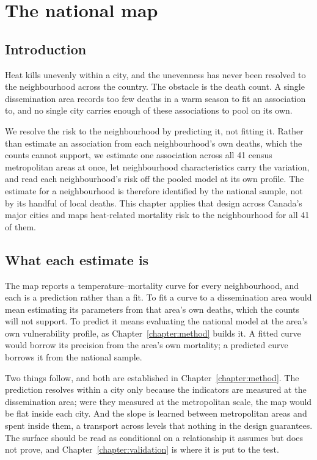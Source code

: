 \chapter{The national map}

\section{Introduction}

Heat kills unevenly within a city, and the unevenness has never been resolved to the neighbourhood across the country. The obstacle is the death count. A single dissemination area records too few deaths in a warm season to fit an association to, and no single city carries enough of these associations to pool on its own.

We resolve the risk to the neighbourhood by predicting it, not fitting it. Rather than estimate an association from each neighbourhood's own deaths, which the counts cannot support, we estimate one association across all 41 census metropolitan areas at once, let neighbourhood characteristics carry the variation, and read each neighbourhood's risk off the pooled model at its own profile. The estimate for a neighbourhood is therefore identified by the national sample, not by its handful of local deaths. This chapter applies that design across Canada's major cities and maps heat-related mortality risk to the neighbourhood for all 41 of them.

\section{What each estimate is}

The map reports a temperature--mortality curve for every neighbourhood, and each is a prediction rather than a fit. To fit a curve to a dissemination area would mean estimating its parameters from that area's own deaths, which the counts will not support. To predict it means evaluating the national model at the area's own vulnerability profile, as Chapter~\ref{chapter:method} builds it. A fitted curve would borrow its precision from the area's own mortality; a predicted curve borrows it from the national sample.

Two things follow, and both are established in Chapter~\ref{chapter:method}. The prediction resolves within a city only because the indicators are measured at the dissemination area; were they measured at the metropolitan scale, the map would be flat inside each city. And the slope is learned between metropolitan areas and spent inside them, a transport across levels that nothing in the design guarantees. The surface should be read as conditional on a relationship it assumes but does not prove, and Chapter~\ref{chapter:validation} is where it is put to the test.

